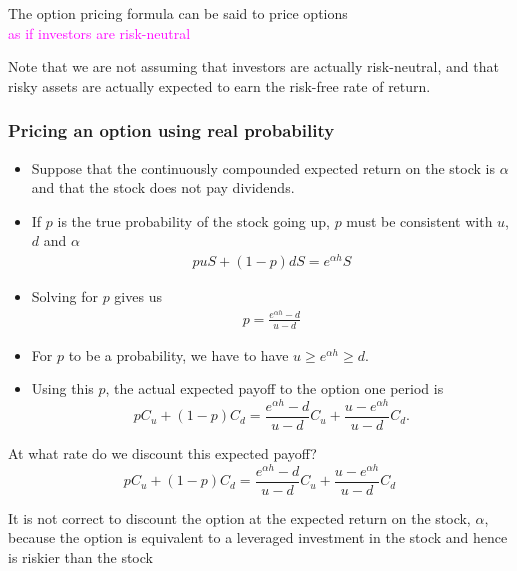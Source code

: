 \begin{frame}[fragile]
\begin{center}

	The option pricing formula can be said to price options \\
	\textcolor{magenta}{as if investors are risk-neutral}
	\bigskip

	Note that we are not assuming that investors are actually risk-neutral, and that risky assets are actually expected to earn the risk-free rate of return.
\end{center}
\end{frame}
\begin{frame}[fragile,t]
	\frametitle{Pricing an option using real probability}
\begin{itemize}
	\item Suppose that the continuously compounded expected return on the stock is $\alpha$ and that the stock does not pay dividends.
	\item If $p$ is the true probability of the stock going up, $p$ must be consistent with $u$, $d$ and $\alpha$
		\begin{align*}
			puS + (1-p) dS = e^{\alpha h} S
		\end{align*}
	\item Solving for $p$ gives us
		\begin{align*}
			p= \frac{e^{\alpha h}-d}{u-d}
		\end{align*}
	\item For $p$ to be a probability, we have to have  $u\ge e^{\alpha h}\ge d$.
	\item Using this $p$, the actual expected payoff to the option one period is
		\begin{equation*}
			p C_u + (1-p) C_d = \frac{e^{\alpha h}-d}{u-d} C_u + \frac{u-e^{\alpha h}}{u-d}C_d.
		\end{equation*}
\end{itemize}
\end{frame}
\begin{frame}[fragile,t]
		\begin{center}
	    At what rate do we discount this expected payoff?
			\begin{equation*}
				p C_u + (1-p) C_d = \frac{e^{\alpha h}-d}{u-d} C_u + \frac{u-e^{\alpha h}}{u-d}C_d
			\end{equation*}
			\mySeparateLine
			\bigskip
			\pause

	    It is not correct to discount the option at the expected return on the stock, $\alpha$, because the option is equivalent to a leveraged investment in the stock and hence is riskier than the stock
		\end{center}
\end{frame}
